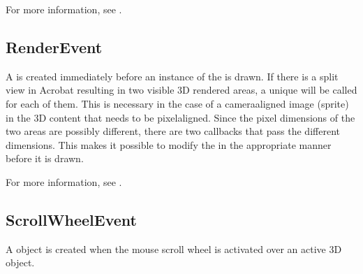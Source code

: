 \documentclass[letterpaper,12pt,english,openany,oneside]{sphinxmanual}
\begin{document}
\begin{sphinxVerbatim}[commandchars=\\\{\}]
                 
     
          
           
         
         
   
\end{sphinxVerbatim}

For more information, see .


\subsection{RenderEvent}
\label{\detokenize{index:renderevent}}
A  is created immediately before an instance of the  is drawn. If there is a split view in Acrobat resulting in two visible 3D rendered areas, a unique  will be called for each of them. This is necessary in the case of a camera\sphinxhyphen{}aligned image (sprite) in the 3D content that needs to be pixel\sphinxhyphen{}aligned. Since the pixel dimensions of the two areas are possibly different, there are two callbacks that pass the different dimensions. This makes it possible to modify the  in the appropriate manner before it is drawn.

For more information, see .


\subsection{ScrollWheelEvent}
\label{\detokenize{index:scrollwheelevent}}
A  object is created when the mouse scroll wheel is activated over an active 3D  object.
\end{document}
